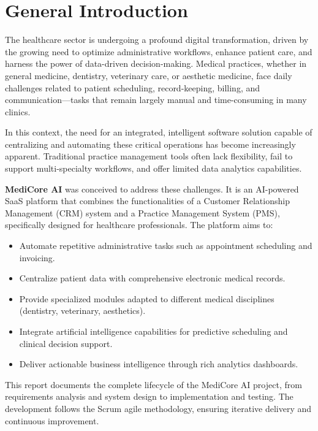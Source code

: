 \documentclass[12pt,a4paper,oneside]{report}
\begin{document}
\chapter*{General Introduction}

The healthcare sector is undergoing a profound digital transformation, driven by the growing need to optimize administrative workflows, enhance patient care, and harness the power of data-driven decision-making. Medical practices, whether in general medicine, dentistry, veterinary care, or aesthetic medicine, face daily challenges related to patient scheduling, record-keeping, billing, and communication—tasks that remain largely manual and time-consuming in many clinics.

In this context, the need for an integrated, intelligent software solution capable of centralizing and automating these critical operations has become increasingly apparent. Traditional practice management tools often lack flexibility, fail to support multi-specialty workflows, and offer limited data analytics capabilities.

\textbf{MediCore AI} was conceived to address these challenges. It is an AI-powered SaaS platform that combines the functionalities of a Customer Relationship Management (CRM) system and a Practice Management System (PMS), specifically designed for healthcare professionals. The platform aims to:

\begin{itemize}
    \item Automate repetitive administrative tasks such as appointment scheduling and invoicing.
    \item Centralize patient data with comprehensive electronic medical records.
    \item Provide specialized modules adapted to different medical disciplines (dentistry, veterinary, aesthetics).
    \item Integrate artificial intelligence capabilities for predictive scheduling and clinical decision support.
    \item Deliver actionable business intelligence through rich analytics dashboards.
\end{itemize}

This report documents the complete lifecycle of the MediCore AI project, from requirements analysis and system design to implementation and testing. The development follows the Scrum agile methodology, ensuring iterative delivery and continuous improvement.
\end{document}
